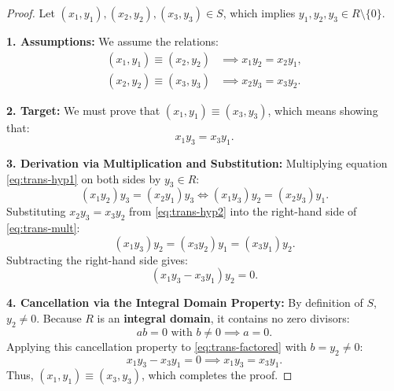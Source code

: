 \begin{content}

\begin{proof}
Let $(x_1, y_1), (x_2, y_2), (x_3, y_3) \in S$, which implies $y_1, y_2, y_3 \in R \setminus \{0\}$.

\textbf{1. Assumptions:}
We assume the relations:
\begin{align}
(x_1, y_1) \equiv (x_2, y_2) &\implies x_1 y_2 = x_2 y_1, \label{eq:trans-hyp1} \\
(x_2, y_2) \equiv (x_3, y_3) &\implies x_2 y_3 = x_3 y_2. \label{eq:trans-hyp2}
\end{align}

\textbf{2. Target:}
We must prove that $(x_1, y_1) \equiv (x_3, y_3)$, which means showing that:
\begin{equation}\label{eq:trans-target}
x_1 y_3 = x_3 y_1.
\end{equation}

\textbf{3. Derivation via Multiplication and Substitution:}
Multiplying equation \eqref{eq:trans-hyp1} on both sides by $y_3 \in R$:
\begin{equation}\label{eq:trans-mult}
(x_1 y_2) y_3 = (x_2 y_1) y_3 \iff (x_1 y_3) y_2 = (x_2 y_3) y_1.
\end{equation}
Substituting $x_2 y_3 = x_3 y_2$ from \eqref{eq:trans-hyp2} into the right-hand side of \eqref{eq:trans-mult}:
\begin{equation}\label{eq:trans-subst}
(x_1 y_3) y_2 = (x_3 y_2) y_1 = (x_3 y_1) y_2.
\end{equation}
Subtracting the right-hand side gives:
\begin{equation}\label{eq:trans-factored}
(x_1 y_3 - x_3 y_1) y_2 = 0.
\end{equation}

\textbf{4. Cancellation via the Integral Domain Property:}
By definition of $S$, $y_2 \ne 0$. Because $R$ is an \textbf{integral domain}, it contains no zero divisors:
\[
ab = 0 \text{ with } b \ne 0 \implies a = 0.
\]
Applying this cancellation property to \eqref{eq:trans-factored} with $b = y_2 \ne 0$:
\[
x_1 y_3 - x_3 y_1 = 0 \implies x_1 y_3 = x_3 y_1.
\]
Thus, $(x_1, y_1) \equiv (x_3, y_3)$, which completes the proof.
\end{proof}


\end{content}
